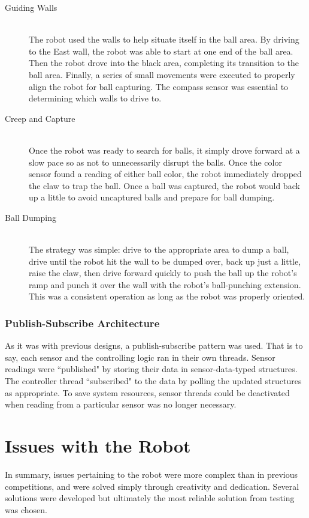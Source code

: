 \documentclass{article}
\begin{document}
\begin{description}
  \item[Guiding Walls] \hfill \\
  The robot used the walls to help situate itself in the ball area. By driving to the East wall, the robot was able to start at one end of the ball area. Then the robot drove into the black area, completing its transition to the ball area. Finally, a series of small movements were executed to properly align the robot for ball capturing. The compass sensor was essential to determining which walls to drive to.

  \item[Creep and Capture] \hfill \\
  Once the robot was ready to search for balls, it simply drove forward at a slow pace so as not to unnecessarily disrupt the balls. Once the color sensor found a reading of either ball color, the robot immediately dropped the claw to trap the ball. Once a ball was captured, the robot would back up a little to avoid uncaptured balls and prepare for ball dumping.

  \item[Ball Dumping] \hfill \\
  The strategy was simple: drive to the appropriate area to dump a ball, drive until the robot hit the wall to be dumped over, back up just a little, raise the claw, then drive forward quickly to push the ball up the robot's ramp and punch it over the wall with the robot's ball-punching extension. This was a consistent operation as long as the robot was properly oriented.
\end{description}

\subsubsection{Publish-Subscribe Architecture}
As it was with previous designs, a publish-subscribe pattern was used. That is to say, each sensor and the controlling logic ran in their own threads. Sensor readings were ``published" by storing their data in sensor-data-typed structures. The controller thread ``subscribed" to the data by polling the updated structures as appropriate. To save system resources, sensor threads could be deactivated when reading from a particular sensor was no longer necessary.

\section{Issues with the Robot}
In summary, issues pertaining to the robot were more complex than in previous competitions, and were solved simply through creativity and dedication. Several solutions were developed but ultimately the most reliable solution from testing was chosen. 
\end{document}

